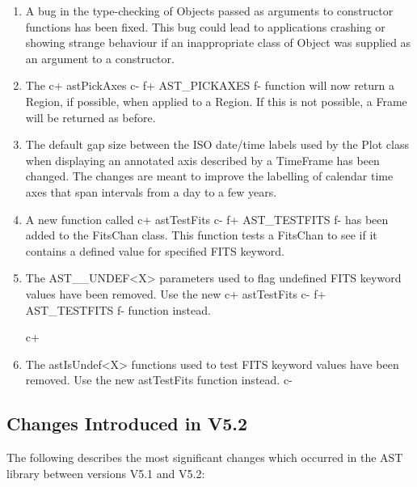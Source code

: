 \documentclass[twoside,11pt]{article}
\begin{document}
\begin{enumerate}
\item A bug in the type-checking of Objects passed as arguments to constructor
functions has been fixed. This bug could lead to applications crashing or
showing strange behaviour if an inappropriate class of Object was
supplied as an argument to a constructor.

\item The
c+
astPickAxes
c-
f+
AST\_PICKAXES
f-
function will now return a Region, if possible, when applied to a Region. If
this is not possible, a Frame will be returned as before.

\item The default gap size between the ISO date/time labels used by the Plot
class when displaying an annotated axis described by a TimeFrame has been
changed. The changes are meant to improve the labelling of calendar time
axes that span intervals from a day to a few years.

\item A new function called
c+
astTestFits
c-
f+
AST\_TESTFITS
f-
has been added to the FitsChan class. This function tests a FitsChan to
see if it contains a defined value for specified FITS keyword.

\item The AST\_\_UNDEF<X> parameters used to flag undefined FITS keyword values
have been removed. Use the new
c+
astTestFits
c-
f+
AST\_TESTFITS
f-
function instead.

c+
\item The astIsUndef<X> functions used to test FITS keyword values
have been removed. Use the new astTestFits function instead.
c-

\end{enumerate}

\subsection{Changes Introduced in V5.2}

The following describes the most significant changes which
occurred in the AST library between versions V5.1 and V5.2:
\end{document}
